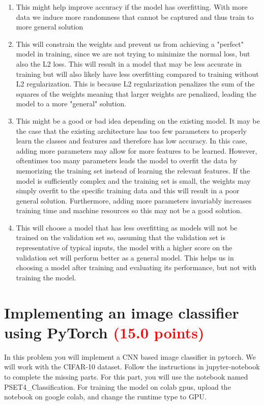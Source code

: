 \documentclass[answers]{exam}
\newcommand{\mypoints}[1]{\textcolor{red}{(#1 points)}}
\begin{document}
\begin{solution}
    \begin{enumerate}
        \item This might help improve accuracy if the model has overfitting. With more data we induce more randomness that cannot be captured and thus train to more general solution
        \item This will constrain the weights and prevent us from achieving a "perfect" model in training, since we are not trying to minimize the normal loss, but also the L2 loss. This will result in
        a model that may be less accurate in training but will also likely have less overfitting compared to training without L2 regularization. This is because L2 regularization penalizes the sum of the squares of the weights meaning that larger weights are penalized, leading the model to a more "general" solution.
        \item This might be a good or bad idea depending on the existing model. It may be the case that the existing architecture has too few parameters to properly learn the classes and features and therefore
        has low accuracy. In this case, adding more parameters may allow for more features to be learned. However, oftentimes too many parameters leads the model to overfit the data by memorizing the training set instead of learning the relevant features. If the model is sufficiently complex and the training set is small, the weights may simply overfit to the specific training data and this will result in a poor general solution. Furthermore, adding more parameters invariably increases training time and machine resources so this may not be a good solution.
        \item This will choose a model that has less overfitting as models will not be trained on the validation set so, assuming that the validation set is representative of typical inputs, the model
        with a higher score on the validation set will perform better as a general model. This helps us in choosing a model after training and evaluating its performance, but not with training the model.
    \end{enumerate}
\end{solution}


\newpage

\section{Implementing an image classifier using PyTorch \mypoints{15.0}}
In this problem you will implement a CNN based image classifier in pytorch. We will work with the CIFAR-10 dataset. Follow the instructions in jupyter-notebook to complete the missing parts. For this part, you will use the notebook named PSET4\_Classification. For training the model on colab gpus, upload the notebook on google colab, and change the runtime type to GPU. 
\end{document}
